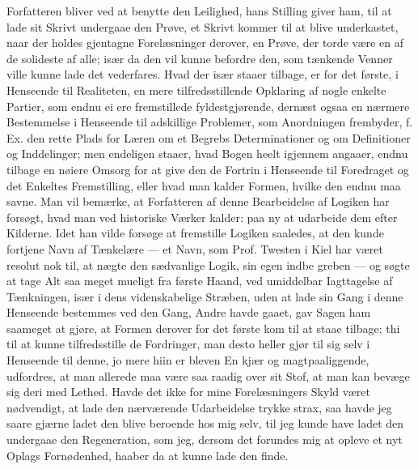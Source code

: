 \documentclass[12pt]{book}
\begin{document}
Forfatteren bliver ved at benytte den Leilighed, hans Stilling giver ham, til
at lade sit Skrivt undergaae den Prøve, et Skrivt kommer til at blive
underkastet, naar der holdes gjentagne Forelæsninger derover, en Prøve, der
torde være en af de solideste af alle; især da den vil kunne befordre den, som
tænkende Venner ville kunne lade det vederfares. Hvad der især staaer tilbage,
er for det første, i Henseende til Realiteten, en mere tilfredsstillende
Opklaring af nogle enkelte Partier, som endnu ei ere fremstillede
fyldestgjørende, dernæst ogsaa en nærmere Bestemmelse i Henseende til
adskillige Problemer, som Anordningen frembyder, f. Ex. den rette Plads for
Læren om et Begrebs Determinationer og om Definitioner og
Inddelinger; men endeligen staaer, hvad Bogen heelt igjennem angaaer, endnu
tilbage en nøiere Omsorg for at give den de Fortrin i Henseende til Foredraget
og det Enkeltes Fremstilling, eller hvad man kalder Formen, hvilke den endnu
maa savne. Man vil bemærke, at Forfatteren af denne Bearbeidelse af Logiken
har forsøgt, hvad man ved historiske Værker kalder: paa ny at udarbeide dem
efter Kilderne. Idet han vilde forsøge at fremstille Logiken saaledes, at den
kunde fortjene Navn af Tænkelære --- et Navn, som Prof. Twesten i Kiel har
været resolut nok til, at nægte den sædvanlige Logik, sin egen indbe greben
--- og søgte at tage Alt saa meget mueligt fra første Haand, ved umiddelbar
Iagttagelse af Tænkningen, især i dens videnskabelige Stræben, uden at lade sin
Gang i denne Henseende bestemmes ved den Gang, Andre havde gaaet, gav Sagen ham
saameget at gjøre, at Formen derover for det første kom til at staae tilbage;
thi til at kunne tilfredsstille de Fordringer, man desto heller gjør til sig
selv i Henseende til denne, jo mere hiin er bleven En kjær og magtpaaliggende,
udfordres, at man allerede maa være saa raadig over sit Stof, at man kan bevæge
sig deri med Lethed. Havde det ikke for mine Forelæsningers Skyld været
nødvendigt, at lade den nærværende Udarbeidelse trykke strax, saa havde jeg
saare gjærne ladet den blive beroende hos mig selv, til jeg kunde have ladet
den undergaae den Regeneration, som jeg, dersom det forundes mig at opleve et
nyt Oplags Fornødenhed, haaber da at kunne lade den finde.
\end{document}
